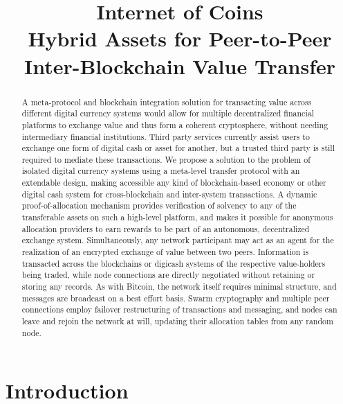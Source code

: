\documentclass[a4paper,fullpack]{article}
\title{Internet of Coins\\[6mm]
\small{Hybrid Assets for Peer-to-Peer Inter-Blockchain Value Transfer}
}
\begin{document}
\maketitle




\begin{abstract}
 A meta-protocol and blockchain integration solution for transacting value across different digital currency systems would allow for multiple decentralized financial platforms to exchange value and thus form a coherent cryptosphere, without needing intermediary financial institutions. Third party services currently assist users to exchange one form of digital cash or asset for another, but a trusted third party is still required to mediate these transactions. We propose a solution to the problem of isolated digital currency systems using a meta-level transfer protocol with an extendable design, making accessible any kind of blockchain-based economy or other digital cash system for cross-blockchain and inter-system transactions. A dynamic proof-of-allocation mechanism provides verification of solvency to any of the transferable assets on such a high-level platform, and makes it possible for anonymous allocation providers to earn rewards to be part of an autonomous, decentralized exchange system. Simultaneously, any network participant may act as an agent for the realization of an encrypted exchange of value between two peers. Information is transacted across the blockchains or digicash systems of the respective value-holders being traded, while node connections are directly negotiated without retaining or storing any records. As with Bitcoin, the network itself requires minimal structure, and messages are broadcast on a best effort basis. Swarm cryptography and multiple peer connections employ failover restructuring of transactions and messaging, and nodes can leave and rejoin the network at will, updating their allocation tables from any random node.
\end{abstract}


\section{Introduction}
\end{document}
